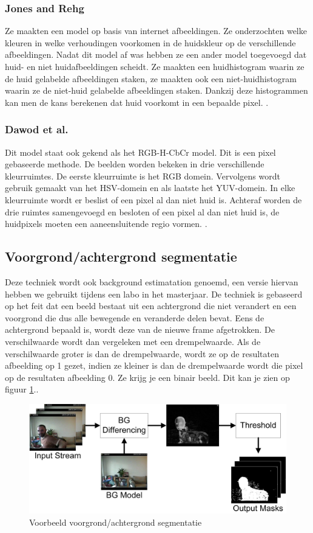 \subsubsection{Jones and Rehg}
Ze maakten een model op basis van internet afbeeldingen. Ze onderzochten welke kleuren in welke verhoudingen voorkomen in de huidskleur op de verschillende afbeeldingen. Nadat dit model af was hebben ze een ander model toegevoegd dat huid- en niet huidafbeeldingen scheidt. Ze maakten een huidhistogram waarin ze de huid gelabelde afbeeldingen staken, ze maakten ook een niet-huidhistogram waarin ze de niet-huid gelabelde afbeeldingen staken. Dankzij deze histogrammen kan men de kans berekenen dat huid voorkomt in een bepaalde pixel. \cite{bibTHK}.

\subsubsection{Dawod et al.}
Dit model staat ook gekend als het RGB-H-CbCr model. Dit is een pixel gebaseerde methode. De beelden worden bekeken in drie verschillende kleurruimtes. De eerste kleurruimte is het RGB domein. Vervolgens wordt gebruik gemaakt van het HSV-domein en als laatste het YUV-domein. In elke kleurruimte wordt er beslist of een pixel al dan niet huid is. Achteraf worden de drie ruimtes samengevoegd en besloten of een pixel al dan niet huid is, de huidpixels moeten een aaneensluitende regio vormen. \cite{bibTHK}.

\subsection{Voorgrond/achtergrond segmentatie}
\label{refBET}
Deze techniek wordt ook background estimatation genoemd, een versie hiervan hebben we gebruikt tijdens een labo in het masterjaar. De techniek is gebaseerd op het feit dat een beeld bestaat uit een achtergrond die niet verandert en een voorgrond die dus alle bewegende en veranderde delen bevat. Eens de achtergrond bepaald is, wordt deze van de nieuwe frame afgetrokken. De verschilwaarde wordt dan vergeleken met een drempelwaarde. Als de verschilwaarde groter is dan de drempelwaarde, wordt ze op de resultaten afbeelding op 1 gezet, indien ze kleiner is dan de  drempelwaarde wordt die pixel op de resultaten afbeelding 0. Ze krijg je een binair beeld. Dit kan je zien op figuur \ref{imgVAS}.\cite{bibVAS}.

\begin{figure}[hbp]
	\includegraphics[scale=0.65]{BackgroundSegmentation}
	\caption{Voorbeeld voorgrond/achtergrond segmentatie}
	\label{imgVAS}
\end{figure}

